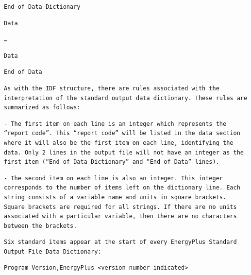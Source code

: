 \begin{lstlisting}
End of Data Dictionary
\end{lstlisting}

\begin{lstlisting}
Data
\end{lstlisting}

\begin{lstlisting}
…
\end{lstlisting}

\begin{lstlisting}
Data
\end{lstlisting}

\begin{lstlisting}
End of Data
\end{lstlisting}

\begin{lstlisting}
As with the IDF structure, there are rules associated with the interpretation of the standard output data dictionary. These rules are summarized as follows:
\end{lstlisting}

\begin{lstlisting}
- The first item on each line is an integer which represents the “report code”. This “report code” will be listed in the data section where it will also be the first item on each line, identifying the data. Only 2 lines in the output file will not have an integer as the first item (“End of Data Dictionary” and “End of Data” lines).
\end{lstlisting}

\begin{lstlisting}
- The second item on each line is also an integer. This integer corresponds to the number of items left on the dictionary line. Each string consists of a variable name and units in square brackets. Square brackets are required for all strings. If there are no units associated with a particular variable, then there are no characters between the brackets.
\end{lstlisting}

\begin{lstlisting}
Six standard items appear at the start of every EnergyPlus Standard Output File Data Dictionary:
\end{lstlisting}

\begin{lstlisting}
Program Version,EnergyPlus <version number indicated>
\end{lstlisting}

